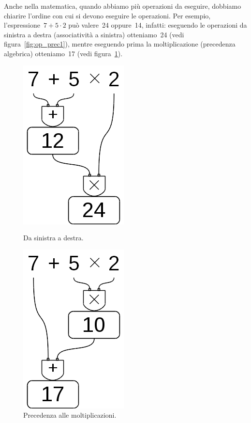 Anche nella matematica, quando abbiamo più operazioni da eseguire, dobbiamo 
chiarire l'ordine con cui si devono eseguire le operazioni. 
Per esempio, l'espressione~$7+5\cdot2$ può valere~24 oppure~14, infatti:
eseguendo le operazioni da sinistra a destra (associatività a sinistra) 
otteniamo~24 (vedi figura~\ref{fig:op_prec1}), 
mentre eseguendo prima la moltiplicazione (precedenza algebrica) 
otteniamo~17
(vedi figura~\ref{fig:op_prec2}).
 
\begin{inaccessibleblock}[]
\begin{figure}[h]
 \centering
 \begin{minipage}[t]{.40\textwidth}
  \centering\includegraphics[scale=0.35]{img/op_prec1.png}
  \caption{Da sinistra a destra.}\label{fig:op_prec1}
 \end{minipage}\hfil
 \begin{minipage}[t]{.50\textwidth}
  \centering\includegraphics[scale=0.35]{img/op_prec2.png}
  \caption{Precedenza alle moltiplicazioni.}\label{fig:op_prec2}
 \end{minipage}
\end{figure}
\end{inaccessibleblock}

